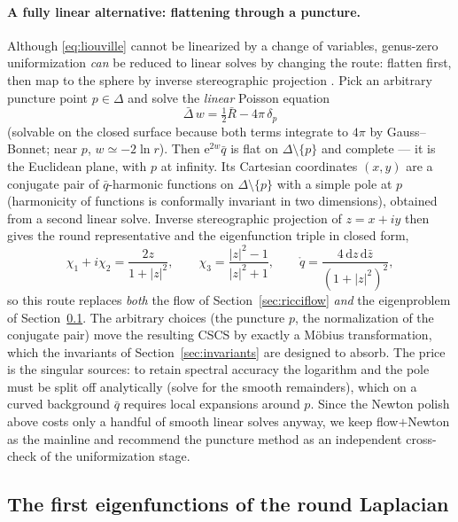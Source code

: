 \documentclass[11pt]{article}
\newcommand{\dd}{\mathrm{d}}
\newcommand{\ee}{\mathrm{e}}
\newcommand{\qo}{\mathring{q}}          %
\begin{document}
\paragraph{A fully linear alternative: flattening through a puncture.}
Although \eqref{eq:liouville} cannot be linearized by a change of variables,
genus-zero uniformization \emph{can} be reduced to linear solves by changing
the route: flatten first, then map to the sphere by inverse stereographic
projection \cite{haker2000}.  Pick an arbitrary puncture point
$p\in\Delta$ and solve the \emph{linear} Poisson equation
\begin{equation}
  \bar\Delta\, w = \tfrac12\bar R - 4\pi\,\delta_p
  \label{eq:puncture}
\end{equation}
(solvable on the closed surface because both terms integrate to $4\pi$ by
Gauss--Bonnet; near $p$, $w \simeq -2\ln r$).  Then $\ee^{2w}\bar q$ is flat
on $\Delta\setminus\{p\}$ and complete --- it is the Euclidean plane, with
$p$ at infinity.  Its Cartesian coordinates $(x,y)$ are a conjugate pair of
$\bar q$-harmonic functions on $\Delta\setminus\{p\}$ with a simple pole at
$p$ (harmonicity of functions is conformally invariant in two dimensions),
obtained from a second linear solve.  Inverse stereographic projection of
$z = x+iy$ then gives the round representative and the eigenfunction triple
in closed form,
\begin{equation}
  \chi_1 + i\chi_2 = \frac{2z}{1+|z|^2},
  \qquad
  \chi_3 = \frac{|z|^2-1}{|z|^2+1},
  \qquad
  \qo = \frac{4\,\dd z\,\dd\bar z}{(1+|z|^2)^2},
\end{equation}
so this route replaces \emph{both} the flow of
Section~\ref{sec:ricciflow} \emph{and} the eigenproblem of
Section~\ref{sec:eigen}.  The arbitrary choices (the puncture $p$, the
normalization of the conjugate pair) move the resulting CSCS by exactly a
M\"obius transformation, which the invariants of
Section~\ref{sec:invariants} are designed to absorb.  The price is the
singular sources: to retain spectral accuracy the logarithm and the pole
must be split off analytically (solve for the smooth remainders), which on
a curved background $\bar q$ requires local expansions around $p$.  Since
the Newton polish above costs only a handful of smooth linear solves anyway,
we keep flow$+$Newton as the mainline and recommend the puncture method as
an independent cross-check of the uniformization stage.

\subsection{The first eigenfunctions of the round Laplacian}
\label{sec:eigen}
\end{document}
